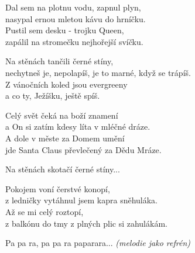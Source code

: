 
\ve{}
Dal sem na plotnu vodu, zapnul plyn,\\
nasypal ernou mletou kávu do hrníčku.\\
Pustil sem desku - trojku Queen,\\
zapálil na stromečku nejhořejší svíčku.

Na stěnách tančili černé stíny,\\
nechytneš je, nepolapíš, je to marné, když se trápíš.\\
Z vánočních koled jsou evergreeny\\
a co ty, Ježíšku, ještě spíš.

\ve{}
Celý svět čeká na boží znamení\\
a On si zatím kdesy líta v mléčné dráze.\\
A dole v měste za Domem umění\\
jde Santa Claus převlečený za Dědu Mráze.

Na stěnách skotačí černé stíny...

\ve 
Pokojem voní čerstvé konopí,\\
z ledničky vytáhnul jsem kapra sněhuláka.\\
Až se mi celý roztopí,\\
z balkónu do tmy z plných plic si zahulákám.

\cho{}
Pa pa ra, pa pa ra paparara... \textit{(melodie jako refrén)}


\esong